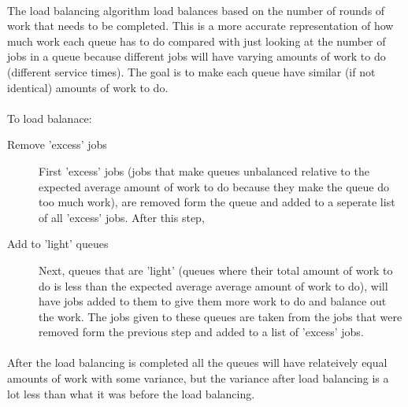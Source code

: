 \documentclass[12pt]{article}
\begin{document}
\paragraph{} The load balancing algorithm load balances based on the number of rounds of work that needs to be completed. This is a more accurate representation of how much work each queue has to do compared with just looking at the number of jobs in a queue because different jobs will have varying amounts of work to do (different service times). The goal is to make each queue have similar (if not identical) amounts of work to do.

\paragraph{} To load balanace:
\begin{description}
  \item [Remove 'excess' jobs] First 'excess' jobs (jobs that make queues unbalanced relative to the expected average amount of work to do because they make the queue do too much work), are removed form the queue and added to a seperate list of all 'excess' jobs. After this step,
  \item [Add to 'light' queues] Next, queues that are 'light' (queues where their total amount of work to do is less than the expected average average amount of work to do), will have jobs added to them to give them more work to do and balance out the work. The jobs given to these queues are taken from the jobs that were removed form the previous step and added to a list of 'excess' jobs.
\end{description}
\paragraph{} After the load balancing is completed all the queues will have relateively equal amounts of work with some variance, but the variance after load balancing is a lot less than what it was before the load balancing.
\end{document}
